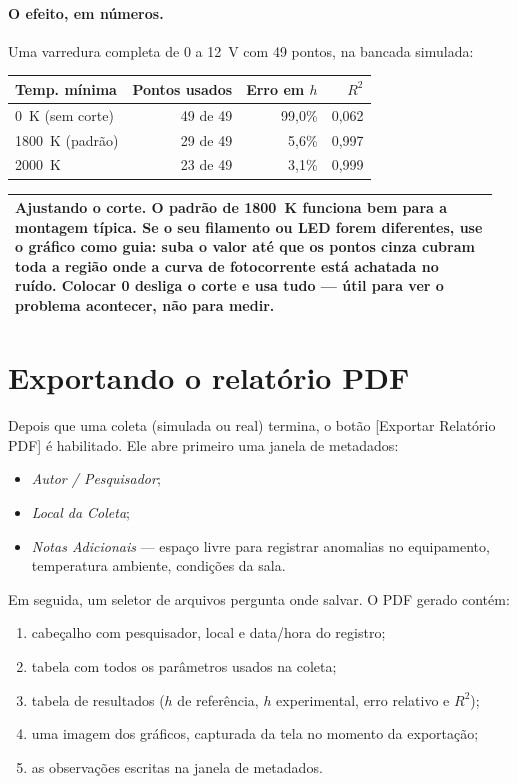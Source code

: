 \documentclass[11pt,a4paper]{article}
\newcommand{\botao}[1]{\textsf{[#1]}}
\newcommand{\campo}[1]{\textsf{\textit{#1}}}
\newenvironment{aviso}
  {\par\medskip\noindent\begin{tabular}{|p{0.96\linewidth}|}\hline\rule{0pt}{3ex}}
  {\\[1ex]\hline\end{tabular}\par\medskip}
\begin{document}
\paragraph{O efeito, em números.}
Uma varredura completa de 0 a 12~V com 49 pontos, na bancada simulada:

\begin{center}
\begin{tabular}{@{}lrrr@{}}
\toprule
\textbf{Temp. mínima} & \textbf{Pontos usados} & \textbf{Erro em $h$} & \textbf{$R^2$} \\
\midrule
0~K (sem corte) & 49 de 49 & 99{,}0\% & 0{,}062 \\
1800~K (padrão) & 29 de 49 & 5{,}6\% & 0{,}997 \\
2000~K & 23 de 49 & 3{,}1\% & 0{,}999 \\
\bottomrule
\end{tabular}
\end{center}

\begin{aviso}
\textbf{Ajustando o corte.} O padrão de 1800~K funciona bem para a montagem
típica. Se o seu filamento ou LED forem diferentes, use o gráfico como guia:
suba o valor até que os pontos cinza cubram toda a região onde a curva de
fotocorrente está achatada no ruído. Colocar 0 desliga o corte e usa tudo ---
útil para ver o problema acontecer, não para medir.
\end{aviso}

\section{Exportando o relatório PDF}

Depois que uma coleta (simulada ou real) termina, o botão
\botao{Exportar Relatório PDF} é habilitado. Ele abre primeiro uma janela de
metadados:

\begin{itemize}[nosep]
  \item \campo{Autor / Pesquisador};
  \item \campo{Local da Coleta};
  \item \campo{Notas Adicionais} --- espaço livre para registrar anomalias no
        equipamento, temperatura ambiente, condições da sala.
\end{itemize}

Em seguida, um seletor de arquivos pergunta onde salvar. O PDF gerado contém:

\begin{enumerate}[nosep]
  \item cabeçalho com pesquisador, local e data/hora do registro;
  \item tabela com todos os parâmetros usados na coleta;
  \item tabela de resultados ($h$ de referência, $h$ experimental, erro
        relativo e $R^2$);
  \item uma imagem dos gráficos, capturada da tela no momento da exportação;
  \item as observações escritas na janela de metadados.
\end{enumerate}
\end{document}
